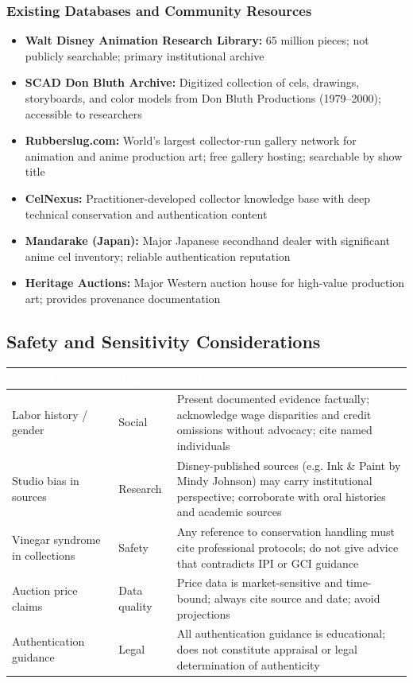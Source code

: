 \documentclass[11pt,letterpaper]{article}
\newcommand{\tableheader}[1]{\textbf{\sffamily\textcolor{white}{#1}}}
\begin{document}
\subsubsection{Existing Databases and Community Resources}

\begin{itemize}
  \item \textbf{Walt Disney Animation Research Library:} 65 million pieces; not publicly searchable; primary institutional archive
  \item \textbf{SCAD Don Bluth Archive:} Digitized collection of cels, drawings, storyboards, and color models from Don Bluth Productions (1979--2000); accessible to researchers
  \item \textbf{Rubberslug.com:} World's largest collector-run gallery network for animation and anime production art; free gallery hosting; searchable by show title
  \item \textbf{CelNexus:} Practitioner-developed collector knowledge base with deep technical conservation and authentication content
  \item \textbf{Mandarake (Japan):} Major Japanese secondhand dealer with significant anime cel inventory; reliable authentication reputation
  \item \textbf{Heritage Auctions:} Major Western auction house for high-value production art; provides provenance documentation
\end{itemize}

\subsection{Safety and Sensitivity Considerations}

\begin{center}
\begin{tabularx}{\textwidth}{L{3.5cm}L{2cm}X}
\toprule
{}
\tableheader{Consideration} & \tableheader{Type} & \tableheader{Protocol} \\
\midrule
Labor history / gender & Social & Present documented evidence factually; acknowledge wage disparities and credit omissions without advocacy; cite named individuals \\
Studio bias in sources & Research & Disney-published sources (e.g. Ink \& Paint by Mindy Johnson) may carry institutional perspective; corroborate with oral histories and academic sources \\
Vinegar syndrome in collections & Safety & Any reference to conservation handling must cite professional protocols; do not give advice that contradicts IPI or GCI guidance \\
Auction price claims & Data quality & Price data is market-sensitive and time-bound; always cite source and date; avoid projections \\
Authentication guidance & Legal & All authentication guidance is educational; does not constitute appraisal or legal determination of authenticity \\
\bottomrule
\end{tabularx}
\end{center}
\end{document}
